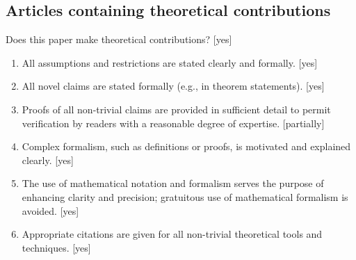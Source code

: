 \documentclass[]{jair}
\begin{document}
\subsection*{Articles containing theoretical contributions}
Does this paper make theoretical contributions? [yes]
\begin{enumerate}
    \item All assumptions and restrictions are stated clearly and formally. [yes]
    \item All novel claims are stated formally (e.g., in theorem statements). [yes]
    \item Proofs of all non-trivial claims are provided in sufficient detail to permit verification by readers with a reasonable degree of expertise. [partially]
    \item Complex formalism, such as definitions or proofs, is motivated and explained clearly. [yes]
    \item The use of mathematical notation and formalism serves the purpose of enhancing clarity and precision; gratuitous use of mathematical formalism is avoided. [yes]
    \item Appropriate citations are given for all non-trivial theoretical tools and techniques. [yes]
\end{enumerate}
\end{document}

